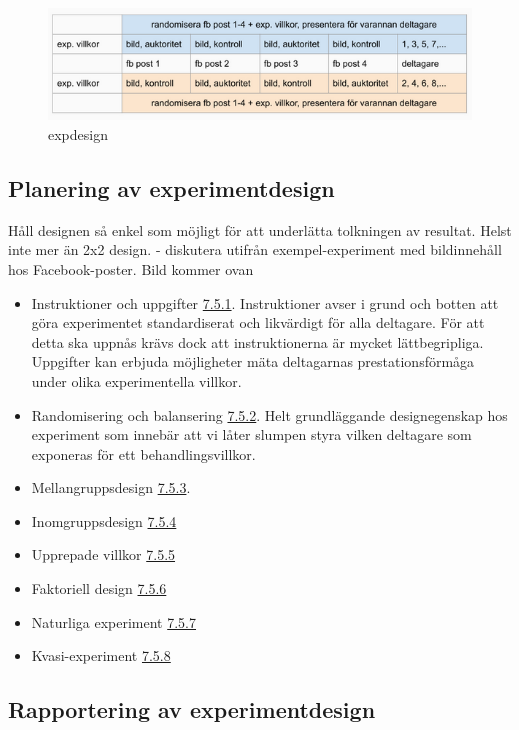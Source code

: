 \documentclass[
]{book}
\begin{document}
\begin{figure}
\centering
\includegraphics{../fig/design.png}
\caption{expdesign}
\end{figure}

\hypertarget{sub07.5.10}{%
\subsection{Planering av experimentdesign}\label{sub07.5.10}}

Håll designen så enkel som möjligt för att underlätta tolkningen av resultat. Helst inte mer än 2x2 design. - diskutera utifrån exempel-experiment med bildinnehåll hos Facebook-poster. Bild kommer ovan

\begin{itemize}
\item
  Instruktioner och uppgifter \protect\hyperlink{sub07.5.1}{7.5.1}. Instruktioner avser i grund och botten att göra experimentet standardiserat och likvärdigt för alla deltagare. För att detta ska uppnås krävs dock att instruktionerna är mycket lättbegripliga. Uppgifter kan erbjuda möjligheter mäta deltagarnas prestationsförmåga under olika experimentella villkor.
\item
  Randomisering och balansering \protect\hyperlink{sub07.5.2}{7.5.2}. Helt grundläggande designegenskap hos experiment som innebär att vi låter slumpen styra vilken deltagare som exponeras för ett behandlingsvillkor.
\item
  Mellangruppsdesign \protect\hyperlink{sub07.5.3}{7.5.3}.
\item
  Inomgruppsdesign \protect\hyperlink{sub07.5.4}{7.5.4}
\item
  Upprepade villkor \protect\hyperlink{sub07.5.5}{7.5.5}
\item
  Faktoriell design \protect\hyperlink{sub07.5.6}{7.5.6}
\item
  Naturliga experiment \protect\hyperlink{sub07.5.7}{7.5.7}
\item
  Kvasi-experiment \protect\hyperlink{sub07.5.8}{7.5.8}
\end{itemize}

\hypertarget{sub07.5.110}{%
\subsection{Rapportering av experimentdesign}\label{sub07.5.110}}
\end{document}
